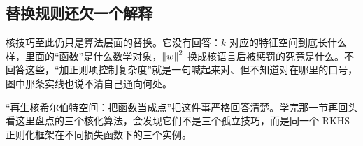 \subsection{替换规则还欠一个解释}

核技巧至此仍只是算法层面的替换。它没有回答：\(k\) 对应的特征空间到底长什么样，里面的``函数''是什么数学对象，\(\left\lVert w\right\rVert^{2}\) 换成核语言后被惩罚的究竟是什么。不回答这些，``加正则项控制复杂度''就是一句喊起来对、但不知道对在哪里的口号，图中那条实线也说不清自己通向何处。

\hyperref[sec:13-Machine-Learning/09-Kernel-Methods-and-Gaussian-Processes/03]{``再生核希尔伯特空间：把函数当成点''}把这件事严格回答清楚。学完那一节再回头看这里盘点的三个核化算法，会发现它们不是三个孤立技巧，而是同一个 RKHS 正则化框架在不同损失函数下的三个实例。
